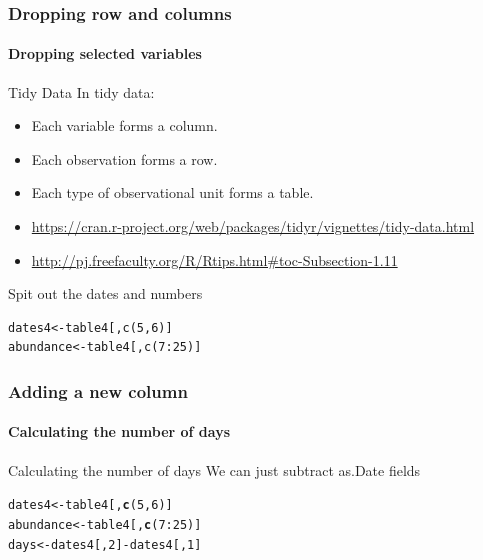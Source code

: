 \documentclass[10pt,handout,english]{beamer}\usepackage[]{graphicx}\usepackage[]{color}
\makeatletter
\newcommand{\hlnum}[1]{\textcolor[rgb]{0.686,0.059,0.569}{#1}}%
\newcommand{\hlopt}[1]{\textcolor[rgb]{0,0,0}{#1}}%
\newcommand{\hlstd}[1]{\textcolor[rgb]{0.345,0.345,0.345}{#1}}%
\newcommand{\hlkwb}[1]{\textcolor[rgb]{0.69,0.353,0.396}{#1}}%
\newcommand{\hlkwd}[1]{\textcolor[rgb]{0.737,0.353,0.396}{\textbf{#1}}}%
\newenvironment{kframe}{%
 \def\at@end@of@kframe{}%
 \ifinner\ifhmode%
  \def\at@end@of@kframe{\end{minipage}}%
  \begin{minipage}{\columnwidth}%
 \fi\fi%
 \def\FrameCommand##1{\hskip\@totalleftmargin \hskip-\fboxsep
 \colorbox{shadecolor}{##1}\hskip-\fboxsep
     \hskip-\linewidth \hskip-\@totalleftmargin \hskip\columnwidth}%
 \MakeFramed {\advance\hsize-\width
   \@totalleftmargin\z@ \linewidth\hsize
   \@setminipage}}%
 {\par\unskip\endMakeFramed%
 \at@end@of@kframe}
\newenvironment{knitrout}{}{} %
\makeatother
\begin{document}
\begin{frame}[fragile]
  \frametitle{Dropping row and columns}
  \framesubtitle{Dropping selected variables}

\begin{block}{Tidy Data}
In tidy data:
\begin{itemize}
\item Each variable forms a column.
\item Each observation forms a row.
\item Each type of observational unit forms a table.
\item \url{https://cran.r-project.org/web/packages/tidyr/vignettes/tidy-data.html}
\item \url{http://pj.freefaculty.org/R/Rtips.html#toc-Subsection-1.11}
\end{itemize}
\end{block}
 

\begin{block}{Spit out the dates and numbers}
\end{block}
\begin{lstlisting}
dates4<-table4[,c(5,6)]
abundance<-table4[,c(7:25)]
\end{lstlisting}
\end{frame}


\begin{frame}[fragile]
  \frametitle{Adding a new column}
  \framesubtitle{Calculating the number of days}
  \begin{block}{Calculating the number of days}
  We can just subtract as.Date fields
  \end{block}
\begin{knitrout}
\color{fgcolor}\begin{kframe}
\begin{alltt}
\hlstd{dates4}\hlkwb{<-}\hlstd{table4[,}\hlkwd{c}\hlstd{(}\hlnum{5}\hlstd{,}\hlnum{6}\hlstd{)]}
\hlstd{abundance}\hlkwb{<-}\hlstd{table4[,}\hlkwd{c}\hlstd{(}\hlnum{7}\hlopt{:}\hlnum{25}\hlstd{)]}
 \hlstd{days}\hlkwb{<-}\hlstd{dates4[,}\hlnum{2}\hlstd{]}\hlopt{-}\hlstd{dates4[,}\hlnum{1}\hlstd{]}
\end{alltt}
\end{kframe}
\end{knitrout}
  
\end{frame}


\end{document}
